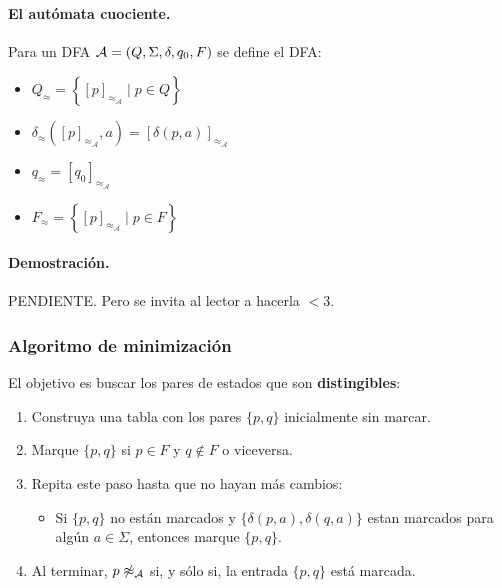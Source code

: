 \paragraph{El autómata cuociente.} Para un DFA $\mathcal{A} = (Q,\Sigma,\delta,q_0,F)$ se define el DFA:
\begin{itemize}
    \item $Q_{\approx}=\left\{[p]_{\approx_\mathcal{A}} \mid p \in Q\right\}$
    \item $\delta_{\approx}\left([p]_{\approx_\mathcal{A}}, a\right)=[\delta(p, a)]_{\approx_\mathcal{A}}$
    \item $q_{\approx}=\left[q_0\right]_{\approx_\mathcal{A}}$
    \item $F_{\approx}=\left\{[p]_{\approx_\mathcal{A}} \mid p \in F\right\}$
\end{itemize}


\paragraph{Demostración.} PENDIENTE. Pero se invita al lector a hacerla $<$3.

\subsubsection{Algoritmo de minimización}

El objetivo es buscar los pares de estados que son \textbf{distingibles}:
\begin{enumerate}
    \item Construya una tabla con los pares $\{p,q\}$ inicialmente sin marcar.
    \item Marque $\{p,q\}$ si $p \in F$ y $q \notin F$ o viceversa.
    \item Repita este paso hasta que no hayan más cambios:
          \begin{itemize}
              \item Si $\{p,q\}$ no están marcados y $\{\delta(p,a),\delta(q,a)\}$ estan marcados para algún $a \in \Sigma$, entonces marque $\{p,q\}$.
          \end{itemize}
    \item Al terminar, $p \not\approx_{\mathcal{A}}$ si, y sólo si, la entrada $\{p,q\}$ está marcada.
\end{enumerate}

